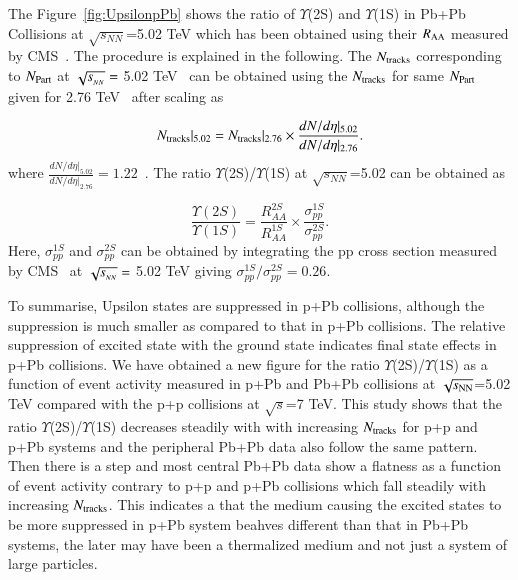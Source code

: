 The  Figure~\ref{fig:UpsilonpPb} shows the ratio of $\Upsilon$(2S)
and $\Upsilon$(1S) in Pb+Pb Collisions at
$\sqrt{s_{NN}}$=5.02 TeV which has been obtained using their $R_{\rm AA}$ measured by
CMS~\cite{CMS:2022wfi}. The procedure is explained in the following.
The $N_{\rm tracks}$ corresponding to $N_{\rm Part}$ at $\sqrt{s_{_{NN}}} =$ 5.02 TeV~\cite{CMS:2018zza}
can be obtained using the $N_{\rm tracks}$ for same $N_{\rm Part}$ given
for 2.76 TeV~\cite{CMS:2013jsu} after scaling as

\begin{equation}
N_{\rm tracks}|_{5.02} =  N_{\rm tracks}|_{2.76} \times \frac{dN/d\eta |_{5.02}} {dN/d\eta|_{2.76}}.
\end{equation}
where $\frac{dN/d\eta |_{5.02}} {dN/d\eta|_{2.76}}=1.22$~\cite{CMS:2018zza,CMS:2013jsu}.
The ratio $\Upsilon$(2S)/$\Upsilon$(1S) at $\sqrt{s_{NN}}$=5.02 can be obtained as 

\begin{equation}
\frac{\Upsilon(2S)}{\Upsilon(1S)} = \frac{R_{AA}^{2S}}{R_{AA}^{1S}} \times \frac{\sigma_{pp}^{1S}}{\sigma_{pp}^{2S}}.
\end{equation}
Here, $\sigma_{pp}^{1S}$ and $\sigma_{pp}^{2S}$ can be obtained by integrating the pp cross section
measured by CMS~\cite{CMS:2013jsu} at $\sqrt{s_{_{NN}}} =$ 5.02 TeV giving $\sigma_{pp}^{1S}/\sigma_{pp}^{2S}=0.26$.





To summarise, Upsilon states are suppressed in p+Pb collisions, although
the suppression is much smaller as compared to that in p+Pb collisions.
The relative suppression of excited state with the ground state indicates final
state effects in p+Pb collisions. 
We have obtained a new figure for the ratio $\Upsilon$(2S)/$\Upsilon$(1S)
as a function of event activity measured in p+Pb and Pb+Pb collisions at
$\sqrt{s_{\rm NN}}$=5.02 TeV compared with the 
p+p collisions at $\sqrt{s}$=7 TeV. This study shows 
that the ratio $\Upsilon$(2S)/$\Upsilon$(1S) decreases steadily
with with increasing $N_{\rm tracks}$ for
p+p and p+Pb systems and the peripheral Pb+Pb data also follow the same pattern.
Then there is a step and most central Pb+Pb
data show a flatness as a function of event activity contrary to p+p and
p+Pb collisions which fall steadily with increasing $N_{\rm tracks}$.
This indicates a that the medium causing the excited states to be more suppressed
in p+Pb system beahves different than that in Pb+Pb systems, the later may have
been a thermalized medium and not just a system of large particles.



  

